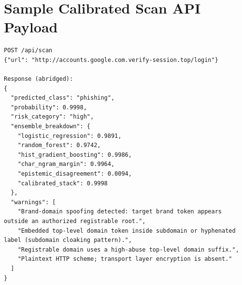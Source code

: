 \documentclass[12pt,a4paper]{report}
\begin{document}
\chapter{Sample Calibrated Scan API Payload}
\begin{lstlisting}
POST /api/scan
{"url": "http://accounts.google.com.verify-session.top/login"}

Response (abridged):
{
  "predicted_class": "phishing",
  "probability": 0.9998,
  "risk_category": "high",
  "ensemble_breakdown": {
    "logistic_regression": 0.9891,
    "random_forest": 0.9742,
    "hist_gradient_boosting": 0.9986,
    "char_ngram_margin": 0.9964,
    "epistemic_disagreement": 0.0094,
    "calibrated_stack": 0.9998
  },
  "warnings": [
    "Brand-domain spoofing detected: target brand token appears outside an authorized registrable root.",
    "Embedded top-level domain token inside subdomain or hyphenated label (subdomain cloaking pattern).",
    "Registrable domain uses a high-abuse top-level domain suffix.",
    "Plaintext HTTP scheme; transport layer encryption is absent."
  ]
}
\end{lstlisting}
\end{document}
